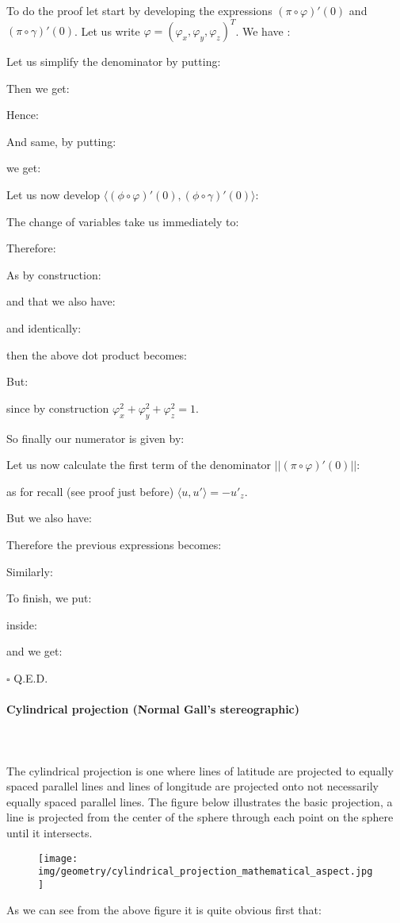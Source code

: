 	\begin{dem}
	To do the proof let start by developing the expressions $(\pi\circ\varphi)'(0)$ and $(\pi\circ\gamma)'(0)$. Let us write $\varphi=(\varphi_x,\varphi_y,\varphi_z)^T$. We have :
	
	Let us simplify the denominator by putting:
	
	Then we get:
	
	Hence:
	
	And same, by putting:
	
	we get:
	
	Let us now develop $\langle (\phi\circ\varphi)'(0),(\phi\circ\gamma)'(0)\rangle$:
	
	The change of variables take us immediately to:
	
	Therefore:
	
	As by construction:
	
	and that we also have:
	
	and identically:
	
	then the above dot product becomes:
	
	But:
	
	since by construction $\varphi_x^2+\varphi_y^2+\varphi_z^2=1$.
	
	So finally our numerator is given by:
	
	Let us now calculate the first term of the denominator $||(\pi\circ\varphi)'(0)||$:
	
	as for recall (see proof just before) $\langle u,u'\rangle=-{u'}_z$.
	
	But we also have:
	
	Therefore the previous expressions becomes:
	
	Similarly:
	
	To finish, we put:
	
	inside:
	
	and we get:
	
	\begin{flushright}
		$\square$  Q.E.D.
	\end{flushright}
	\end{dem}
	
	\pagebreak
	\paragraph{Cylindrical projection (Normal Gall's stereographic)}\mbox{}\\\\
	The cylindrical projection is one where lines of latitude are projected to equally spaced parallel lines and lines of longitude are projected onto not necessarily equally spaced parallel lines. The figure below illustrates the basic projection, a line is projected from the center of the sphere through each point on the sphere until it intersects.
	\begin{figure}[H]
		\centering
		\texttt{[image: img/geometry/cylindrical\_projection\_mathematical\_aspect.jpg]}
	\end{figure}
	As we can see from the above figure it is quite obvious first that:
	
